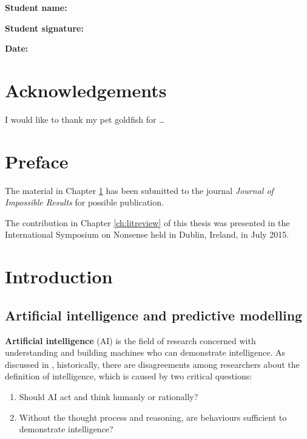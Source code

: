 \documentclass{monashthesis}
\begin{document}
\textbf{Student name:} \authorname

\textbf{Student signature:}

\textbf{Date:}

\hypertarget{acknowledgements}{%
\chapter*{Acknowledgements}\label{acknowledgements}}

I would like to thank my pet goldfish for \dots

\hypertarget{preface}{%
\chapter*{Preface}\label{preface}}

The material in Chapter \ref{ch:intro} has been submitted to the journal \emph{Journal of Impossible Results} for possible publication.

The contribution in Chapter \ref{ch:litreview} of this thesis was presented in the International Symposium on Nonsense held in Dublin, Ireland, in July 2015.

\clearpage{}\setcounter{page}{0}

\hypertarget{ch:intro}{%
\chapter{Introduction}\label{ch:intro}}

\hypertarget{artificial-intelligence-and-predictive-modelling}{%
\section{Artificial intelligence and predictive modelling}\label{artificial-intelligence-and-predictive-modelling}}

\textbf{Artificial intelligence} (AI) is the field of research concerned with understanding and building machines who can demonstrate intelligence. As discussed in \textcite{russell_artificial_2002}, historically, there are disagreements among researchers about the definition of intelligence, which is caused by two critical questions:

\begin{enumerate}
\def\labelenumi{\arabic{enumi}.}
\tightlist
\item
  Should AI act and think humanly or rationally?
\item
  Without the thought process and reasoning, are behaviours sufficient to demonstrate intelligence?
\end{enumerate}
\end{document}

